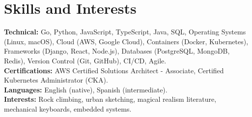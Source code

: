 \documentclass[10pt,letterpaper]{article}
\begin{document}
\section{Skills and Interests}

\textbf{Technical:} Go, Python, JavaScript, TypeScript, Java, SQL, Operating Systems (Linux, macOS), Cloud (AWS, Google Cloud), Containers (Docker, Kubernetes), Frameworks (Django, React, Node.js), Databases (PostgreSQL, MongoDB, Redis), Version Control (Git, GitHub), CI/CD, Agile.\\[6pt]
\textbf{Certifications:} AWS Certified Solutions Architect - Associate, Certified Kubernetes Administrator (CKA).\\[6pt]
\textbf{Languages:} English (native), Spanish (intermediate).\\[6pt]
\textbf{Interests:} Rock climbing, urban sketching, magical realism literature, mechanical keyboards, embedded systems.
\end{document}
